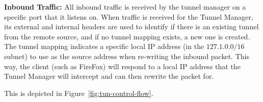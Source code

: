 {\bf Inbound Traffic:} All inbound traffic is received by the tunnel manager on a specific port that it listens on.  When traffic is received
for the Tunnel Manager, its external and internal headers are used to identify if there is an existing tunnel from the remote source, and if
no tunnel mapping exists, a new one is created.  The tunnel mapping indicates a specific local IP address (in the $127.1.0.0/16$ subnet) 
to use as the source address when re-writing the inbound packet.  This way, the client (such as FireFox) will respond to a local IP address
that the Tunnel Manager will intercept and can then rewrite the packet for.

This is depicted in Figure~\ref{fig:tun-control-flow}.
